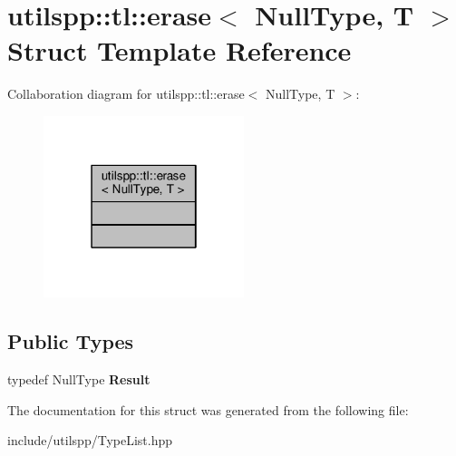 \hypertarget{structutilspp_1_1tl_1_1erase_3_01NullType_00_01T_01_4}{\section{utilspp\-:\-:tl\-:\-:erase$<$ Null\-Type, T $>$ Struct Template Reference}
\label{structutilspp_1_1tl_1_1erase_3_01NullType_00_01T_01_4}
}


Collaboration diagram for utilspp\-:\-:tl\-:\-:erase$<$ Null\-Type, T $>$\-:\nopagebreak
\begin{figure}[H]
\begin{center}
\leavevmode
\includegraphics[width=166pt]{structutilspp_1_1tl_1_1erase_3_01NullType_00_01T_01_4__coll__graph}
\end{center}
\end{figure}
\subsection*{Public Types}
\begin{DoxyCompactItemize}
\item 
\hypertarget{structutilspp_1_1tl_1_1erase_3_01NullType_00_01T_01_4_a103804ca2f41beee15f929b435584254}{typedef Null\-Type {\bfseries Result}}\label{structutilspp_1_1tl_1_1erase_3_01NullType_00_01T_01_4_a103804ca2f41beee15f929b435584254}

\end{DoxyCompactItemize}


The documentation for this struct was generated from the following file\-:\begin{DoxyCompactItemize}
\item 
include/utilspp/Type\-List.\-hpp\end{DoxyCompactItemize}
